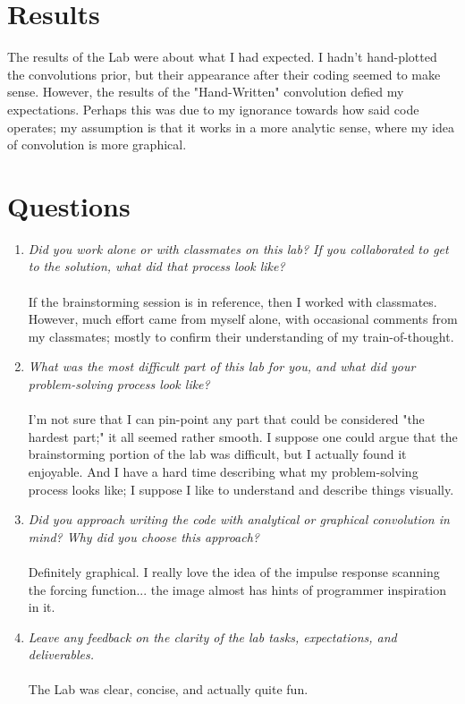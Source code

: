 \documentclass[12pt]{report}
\begin{document}
\section{Results}

The results of the Lab were about what I had expected. I hadn't hand-plotted the convolutions prior, but their appearance after their coding seemed to make sense. However, the results of the "Hand-Written" convolution defied my expectations. Perhaps this was due to my ignorance towards how said code operates; my assumption is that it works in a more analytic sense, where my idea of convolution is more graphical.


\section{Questions}

\begin{enumerate}
    \item \textit{Did you work alone or with classmates on this lab? If you collaborated to get to the solution, what did that process look like?} \\ \\ If the brainstorming session is in reference, then I worked with classmates. However, much effort came from myself alone, with occasional comments from my classmates; mostly to confirm their understanding of my train-of-thought.
    \item \textit{What was the most difficult part of this lab for you, and what did your problem-solving process look like?} \\ \\ I'm not sure that I can pin-point any part that could be considered "the hardest part;" it all seemed rather smooth. I suppose one could argue that the brainstorming portion of the lab was difficult, but I actually found it enjoyable. And I have a hard time describing what my problem-solving process looks like; I suppose I like to understand and describe things visually.
    \item \textit{Did you approach writing the code with analytical or graphical convolution in mind? Why did you choose this approach?} \\ \\ Definitely graphical. I really love the idea of the impulse response scanning the forcing function... the image almost has hints of programmer inspiration in it.
    \item \textit{Leave any feedback on the clarity of the lab tasks, expectations, and deliverables.} \\ \\ The Lab was clear, concise, and actually quite fun.
\end{enumerate}
\pagebreak
\end{document}
